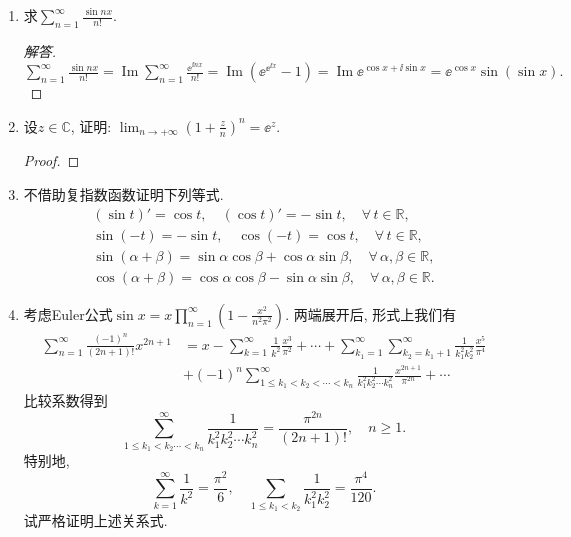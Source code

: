 \begin{4b}
\begin{enumerate}
\item 求\(\sum_{n=1}^{\infty}\frac{\sin nx}{n!}\).
\begin{proof}[解答]
\(\sum_{n=1}^{\infty}\frac{\sin nx}{n!}
=\operatorname{Im}\sum_{n=1}^{\infty}\frac{\ee^{\ii nx}}{n!}
=\operatorname{Im}\left(\ee^{\ee^{\ii x}}-1\right)
=\operatorname{Im}\ee^{\cos x+\ii\sin x}=\ee^{\cos x}\sin\left(\sin x\right).\)
\end{proof}
\item 设\(z\in\mathbb{C}\), 证明: \(\lim_{n\rightarrow+\infty}\left(1+\frac{z}{n}\right)^n=\ee^z\).
\begin{proof}

\end{proof}
\item 不借助复指数函数证明下列等式.
\begin{gather*}
(\sin t)'=\cos t,\quad (\cos t)'=-\sin t,\quad\forall\, t\in\mathbb{R},\\
\sin (-t)=-\sin t,\quad \cos(-t)=\cos t,\quad\forall\, t\in\mathbb{R},\\
\sin (\alpha+\beta)=\sin\alpha\cos\beta+\cos\alpha\sin\beta,\quad\forall\,\alpha,\beta\in\mathbb{R},\\
\cos(\alpha+\beta)=\cos\alpha\cos\beta-\sin\alpha\sin\beta,\quad\forall\,\alpha,\beta\in\mathbb{R}.
\end{gather*}
\item 考虑Euler公式\(\sin x=x\prod_{n=1}^{\infty}\left(1-\frac{x^2}{n^2\pi^2}\right)\). 
两端展开后, 形式上我们有\[\begin{split}
    \sum_{n=1}^{\infty}\frac{(-1)^n}{(2n+1)!}x^{2n+1}
    &=x-\sum_{k=1}^{\infty}\frac{1}{k^2}\frac{x^3}{\pi^2}+\cdots
    +\sum_{k_1=1}^{\infty}\sum_{k_2=k_1+1}^{\infty}\frac{1}{k_1^2k_2^2}\frac{x^5}{\pi^4}\\
    &+(-1)^n\sum_{1\leqslant k_1<k_2<\cdots<k_n}^{\infty}\frac{1}{k_1^2k_2^2\cdots k_n^2}\frac{x^{2n+1}}{\pi^{2n}}+\cdots
\end{split}\]比较系数得到\[\sum_{1\leqslant k_1<k_2\cdots<k_n}^{\infty}\frac{1}{k_1^2k_2^2\cdots k_n^2}=\frac{\pi^{2n}}{(2n+1)!},\quad n\geqslant 1.\]
特别地,\[\sum_{k=1}^{\infty}\frac{1}{k^2}=\frac{\pi^2}{6},\quad\sum_{1\leqslant k_1<k_2}\frac{1}{k_1^2k_2^2}=\frac{\pi^4}{120}.\]试严格证明上述关系式.


\end{enumerate}
\end{4b}
